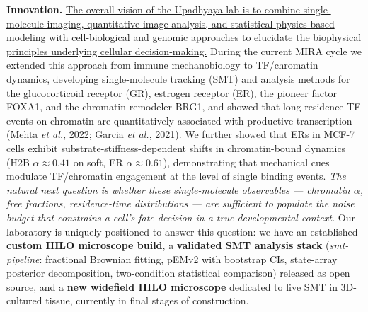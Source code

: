 \documentclass[11pt]{article}
\begin{document}
\textbf{Innovation.} \uline{The overall vision of the Upadhyaya lab is to
combine single-molecule imaging, quantitative image analysis, and
statistical-physics-based modeling with cell-biological and genomic
approaches to elucidate the biophysical principles underlying cellular
decision-making.} During the current MIRA cycle we extended this approach
from immune mechanobiology to TF/chromatin dynamics, developing
single-molecule tracking (SMT) and analysis methods for the glucocorticoid
receptor (GR), estrogen receptor (ER), the pioneer factor FOXA1, and the
chromatin remodeler BRG1, and showed that long-residence TF events on
chromatin are quantitatively associated with productive transcription
(Mehta \textit{et al.}, 2022; Garcia \textit{et al.}, 2021). We further
showed that ERs in MCF-7 cells exhibit substrate-stiffness-dependent
shifts in chromatin-bound dynamics
(H2B $\alpha\!\approx\!0.41$ on soft, ER $\alpha\!\approx\!0.61$),
demonstrating that mechanical cues modulate TF/chromatin engagement at
the level of single binding events. \textit{The natural next question is
whether these single-molecule observables --- chromatin
$\alpha$, free fractions, residence-time distributions --- are sufficient
to populate the noise budget that constrains a cell's fate decision in a
true developmental context.} Our laboratory is uniquely positioned to
answer this question: we have an established \textbf{custom HILO
microscope build}, a \textbf{validated SMT analysis stack}
(\textit{smt-pipeline}: fractional Brownian fitting, pEMv2 with bootstrap
CIs, state-array posterior decomposition, two-condition statistical
comparison) released as open source, and a \textbf{new widefield HILO
microscope} dedicated to live SMT in 3D-cultured tissue, currently in
final stages of construction.
\end{document}
